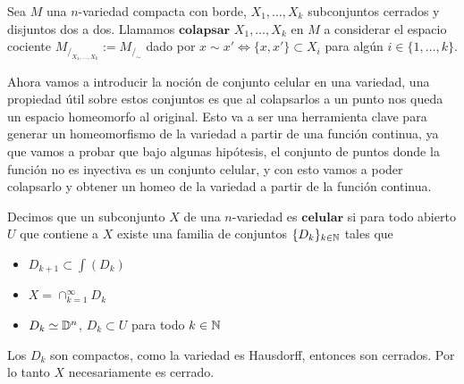 

\begin{df}
    Sea $M$ una $n$-variedad compacta con borde, $X_1,\dots,X_k$ subconjuntos cerrados y disjuntos dos a dos. Llamamos $\textbf{colapsar}$ $X_1,\dots ,X_k$ en $M$ a considerar el espacio cociente $M_{/_{X_1,\dots,X_k}}:=M_{/_\sim} $ dado por $x\sim{} x'\iff \{x,x'\}\subset X_i$ para algún $i\in\{1,\dots,k\}$.
\end{df}

Ahora vamos a introducir la noción de conjunto celular en una variedad, una propiedad útil sobre estos conjuntos es que al colapsarlos a un punto nos queda un espacio homeomorfo al original. Esto va a ser una herramienta clave para generar un homeomorfismo de la variedad a partir de una función continua, ya que vamos a probar que bajo algunas hipótesis, el conjunto de puntos donde la función no es inyectiva es un conjunto celular, y con esto vamos a poder colapsarlo y obtener un homeo de la variedad a partir de la función continua.

\begin{df}
    Decimos que un subconjunto $X$ de una $n$-variedad es $\textbf{celular}$ si para todo abierto $U$ que contiene a $X$ existe una familia de conjuntos $\{D_k\}_{k\in\mathbb{N}}$ tales que 
    
    \begin{itemize}
        \item $D_{k+1}\subset\int(D_k)$
        \item $X=\cap_{k=1}^\infty D_k$
        \item $D_k\simeq\mathbb{D}^n$, $D_k\subset U$ para todo $k\in\mathbb{N}$
    \end{itemize}
\end{df}

\begin{obs}
    Los $D_k$ son compactos, como la variedad es Hausdorff, entonces son cerrados. Por lo tanto $X$ necesariamente es cerrado.
\end{obs}

